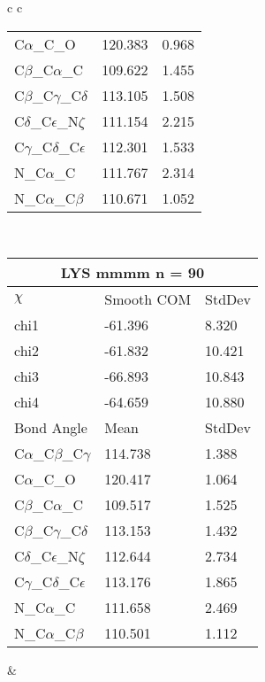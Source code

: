 \begin{longtable}{ c c }
\begin{tabular}{ l l l }
  C$\alpha$\_C\_O & 120.383 & 0.968\\
  C$\beta$\_C$\alpha$\_C & 109.622 & 1.455\\
  C$\beta$\_C$\gamma$\_C$\delta$ & 113.105 & 1.508\\
  C$\delta$\_C$\epsilon$\_N$\zeta$ & 111.154 & 2.215\\
  C$\gamma$\_C$\delta$\_C$\epsilon$ & 112.301 & 1.533\\
  N\_C$\alpha$\_C & 111.767 & 2.314\\
  N\_C$\alpha$\_C$\beta$ & 110.671 & 1.052\\
  \bottomrule
  \end{tabular}
  \\
  \begin{tabular}{ l l l }
  \toprule
  \multicolumn{3}{c}{LYS \textbf{mmmm} n = 90} \\ \toprule
  $\chi$       & Smooth COM & StdDev \\ \midrule
  chi1 & -61.396 & 8.320 \\ 
  chi2 & -61.832 & 10.421 \\ 
  chi3 & -66.893 & 10.843 \\ 
  chi4 & -64.659 & 10.880 \\ \midrule
  Bond Angle   & Mean     & StdDev \\ \midrule
  C$\alpha$\_C$\beta$\_C$\gamma$ & 114.738 & 1.388\\
  C$\alpha$\_C\_O & 120.417 & 1.064\\
  C$\beta$\_C$\alpha$\_C & 109.517 & 1.525\\
  C$\beta$\_C$\gamma$\_C$\delta$ & 113.153 & 1.432\\
  C$\delta$\_C$\epsilon$\_N$\zeta$ & 112.644 & 2.734\\
  C$\gamma$\_C$\delta$\_C$\epsilon$ & 113.176 & 1.865\\
  N\_C$\alpha$\_C & 111.658 & 2.469\\
  N\_C$\alpha$\_C$\beta$ & 110.501 & 1.112\\
  \bottomrule
  \end{tabular}
  &
  \\
  
\end{longtable}    

\newpage
